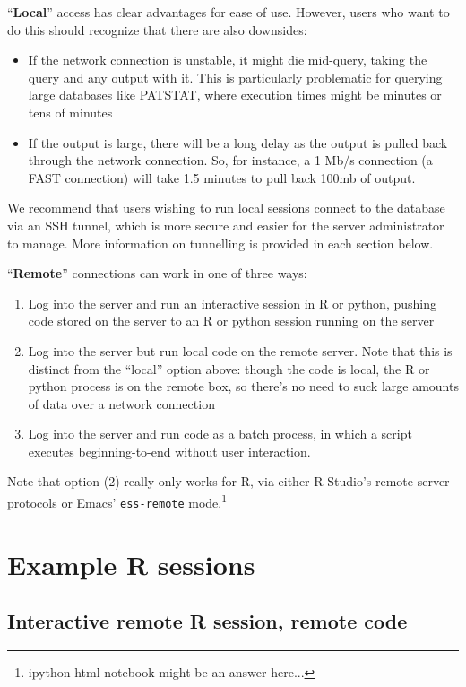 \documentclass[11pt]{article}
\begin{document}
``\textbf{Local}'' access has clear advantages for ease of use. However, users
who want to do this should recognize that there are also downsides:
\begin{itemize}
\item If the network connection is unstable, it might die mid-query,
  taking the query and any output with it. This is particularly
  problematic for querying large databases like PATSTAT, where
  execution times might be minutes or tens of minutes
\item If the output is large, there will
  be a long delay as the output is pulled back through the network
  connection. So, for instance, a 1 Mb/s connection (a FAST
  connection) will take 1.5 minutes to pull back 100mb of output.
\end{itemize}
We recommend that users wishing to run local sessions connect to the
database via an SSH tunnel, which is more secure and easier for the
server administrator to manage. More information on tunnelling is
provided in each section below.


``\textbf{Remote}'' connections can work in one of three ways:
\begin{enumerate}
\item Log into the server and run an interactive session in R or
  python, pushing code stored on the server to an R or python session
  running on the server
\item Log into the server but run local code on the remote
  server. Note that this is distinct from the ``local'' option above:
  though the code is local, the R or python process is on the remote
  box, so there's no need to suck large amounts of data over a network connection
\item Log into the server and run code as a batch process, in which a
  script executes beginning-to-end without user interaction. 
\end{enumerate}

Note that option (2) really only works for R, via either R Studio's
remote server protocols or Emacs' \texttt{ess-remote}
mode.\footnote{ipython html notebook might be an answer here...}


\section{Example R sessions}
\label{sec:sample-r-session}

\subsection{Interactive remote R session, remote code}
\label{sec:remote-r-session-1}
\end{document}
